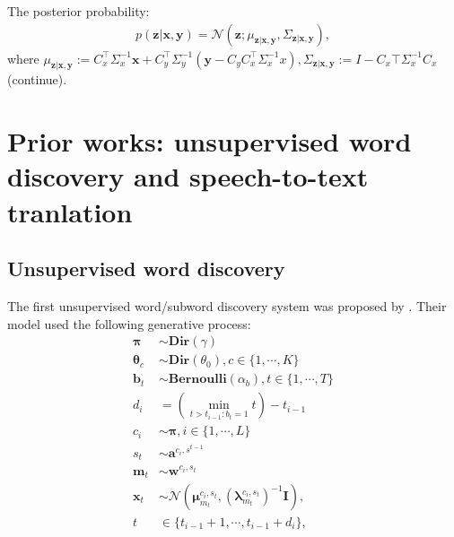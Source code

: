 The posterior probability:
\begin{align*}
    p(\mathbf z|\mathbf x, \mathbf y) = \mathcal N(\mathbf z; \mu_{\mathbf z|\mathbf x, \mathbf y}, \Sigma_{\mathbf z|\mathbf x, \mathbf y}),
\end{align*}
where $\mu_{\mathbf z|\mathbf x, \mathbf y} := C_x^\top \Sigma_x^{-1}\mathbf x + C_y^\top \Sigma_y^{-1}(\mathbf y - C_y C_x^\top \Sigma_x^{-1}x), \Sigma_{\mathbf z|\mathbf x, \mathbf y} := I - C_x\top \Sigma_x^{-1} C_x $(continue).

\section{Prior works: unsupervised word discovery and speech-to-text tranlation}

\subsection{Unsupervised word discovery}
The first unsupervised word/subword discovery system was proposed by \cite{Lee2012}. Their model used the following generative process:
\begin{align}\label{eq:generate_subword_hmm}
    \mathbf \pi &\sim \mathbf{Dir}(\gamma)\\
    \mathbf \theta_c &\sim \mathbf{Dir}(\theta_0), c \in \{1, \cdots, K\}\\
    \mathbf b_t &\sim \mathbf{Bernoulli}(\alpha_b), t \in \{1, \cdots, T\}\\
    d_i &= \left(\min_{t>t_{i-1}:b_t=1} t\right) - t_{i-1}\\
    c_i &\sim \mathbf \pi, i \in \{1, \cdots, L\}\\
    s_t &\sim \mathbf a^{c_i, s^{t-1}}\\
    \mathbf m_t &\sim \mathbf w^{c_i, s_t}\\
    \mathbf x_t &\sim \mathcal N(\mathbf \mu^{c_i, s_t}_{m_t}, (\mathbf \lambda^{c_i, s_t}_{m_t})^{-1}\mathbf I), \\
    t &\in \{t_{i-1}+1, \cdots, t_{i-1}+d_i\},
\end{align}
